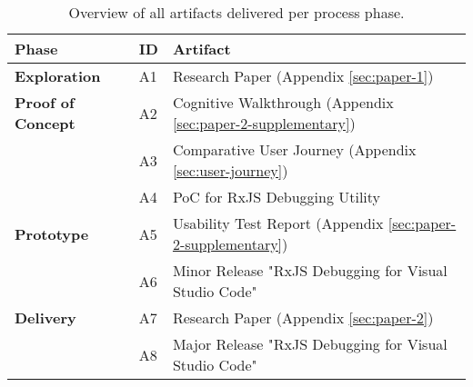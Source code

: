 
\begin{table}[h]
  \label{tbl:artifact-overview}
  \caption{Overview of all artifacts delivered per process phase.}

  \newcommand\Tstrut{\rule{0pt}{2.6ex}}       %
  \newcommand\Bstrut{\rule[-0.9ex]{0pt}{0pt}} %
  \newcommand{\TBstrut}{\Tstrut\Bstrut} %

  \begin{tabular}{llp{7.37cm}}
    \textbf{Phase}                             & \textbf{ID} & \textbf{Artifact}                                     \TBstrut \\
    \hline
    \textbf{Exploration}                       & A1 & Research Paper (Appendix \ref{sec:paper-1})                                       \TBstrut \\
    \hline
    \textbf{Proof of Concept} & A2 & Cognitive Walkthrough (Appendix \ref{sec:paper-2-supplementary})                                \TBstrut \\
                                              & A3 & Comparative User Journey (Appendix \ref{sec:user-journey})                              \Bstrut  \\
                                              & A4 & PoC for RxJS Debugging Utility                        \Bstrut \\
    \hline
    \textbf{Prototype}        & A5 & Usability Test Report (Appendix \ref{sec:paper-2-supplementary})                               \TBstrut  \\
                                              & A6 & Minor Release "RxJS Debugging for Visual Studio Code" \Bstrut \\
    \hline
    \textbf{Delivery}         & A7 & Research Paper (Appendix \ref{sec:paper-2})                                      \TBstrut  \\
                                              & A8 & Major Release "RxJS Debugging for Visual Studio Code" \Bstrut \\
    \hline
  \end{tabular}
\end{table}
